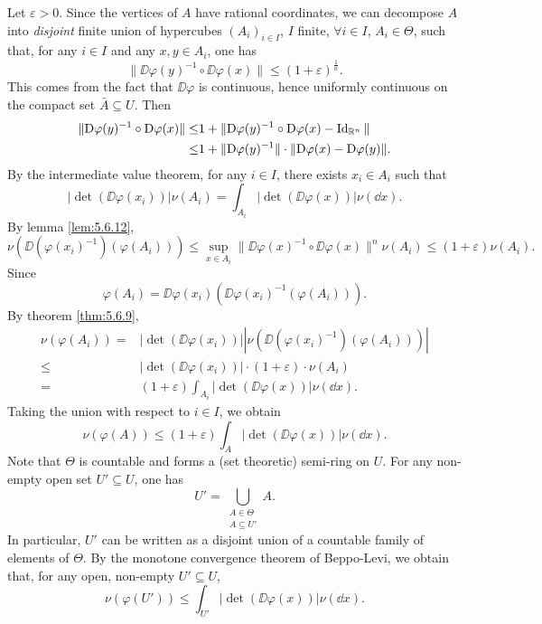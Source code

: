 \begin{proofenv}
    Let $\varepsilon > 0$.
    Since the vertices of $A$ have rational coordinates,
    we can decompose $A$ into \textit{disjoint} finite union of hypercubes $(A_i)_{i\in I}$, $I$ finite, $\forall i \in I$, $A_i \in \Theta$,
    such that, for any $i \in I$ and any $x,y \in A_i$, one has
    $$\|\DD \varphi(y)^{-1} \circ \DD \varphi(x)\| \le (1 + \varepsilon)^{\frac{1}{n}}.$$
    This comes from the fact that $\DD \varphi$ is continuous,
    hence uniformly continuous on the compact set $\bar{A} \subseteq U$.
    Then
    $$\begin{aligned}
        \|\mathrm{D} \varphi(y)^{-1} \circ \mathrm{D} \varphi(x)\| \le & 1 + \|\mathrm{D} \varphi(y)^{-1} \circ \mathrm{D} \varphi(x) - \operatorname{\mathrm{Id}}_{\mathbb{R}^n}\|\\
        \le & 1 + \|\mathrm{D} \varphi(y)^{-1} \| \cdot \| \mathrm{D} \varphi(x) - \mathrm{D} \varphi(y)\|.
    \end{aligned}$$
    By the intermediate value theorem,
    for any $i \in I$, there exists $x_i \in A_i$ such that 
    $$|\det(\DD \varphi(x_i))| \nu(A_i) = \int_{A_i} |\det(\DD \varphi(x))| \nu(\dd x).$$
    By lemma \ref{lem:5.6.12}, 
    $$\nu(\DD(\varphi(x_i)^{-1})(\varphi(A_i))) \le \sup_{x \in A_i}\|\DD \varphi(x)^{-1} \circ \DD\varphi(x)\|^n \nu(A_i) \le (1 + \varepsilon)\nu(A_i).$$
    Since
    $$\varphi(A_i) = \DD\varphi (x_i) \left(\DD \varphi(x_i)^{-1}(\varphi(A_i))\right).$$
    By theorem \ref{thm:5.6.9},
    $$\begin{aligned}
        \nu(\varphi(A_i)) = & |\det(\DD \varphi(x_i))| |\nu (\DD(\varphi(x_i)^{-1})(\varphi(A_i)))|\\
        \le & |\det(\DD \varphi(x_i))| \cdot (1 + \varepsilon) \cdot \nu(A_i)\\
        = & (1 + \varepsilon) \int_{A_i} |\det(\DD \varphi(x))| \nu(\dd x).
    \end{aligned}$$
    Taking the union with respect to $i \in I$,
    we obtain
    $$\nu(\varphi(A)) \le (1 + \varepsilon) \int_{A} |\det(\DD \varphi(x))| \nu(\dd x).$$
    Note that $\Theta$ is countable and forms a (set theoretic) semi-ring on $U$.
    For any non-empty open set $U' \subseteq U$, one has
    $$U' = \bigcup_{\substack{A \in \Theta\\A \subseteq U'}}A.$$
    In particular, $U'$ can be written as a disjoint union of a countable family of elements of $\Theta$.
    By the monotone convergence theorem of Beppo-Levi, we obtain that,
    for any open, non-empty $U'\subseteq U$,
    $$\nu(\varphi(U')) \le \int_{U'} |\det(\DD \varphi(x))| \nu(\dd x).$$

\end{proofenv}
